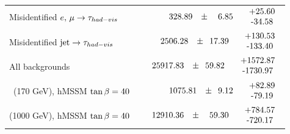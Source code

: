\begin{table}
\begin{center}
{\begin{tabular}{l|r}
			Misidentified $e,\,\mu \to \tau_{had-vis}$   & $\phantom{00}328.89\phantom{.0}\pm\phantom{00}6.85\phantom{.0}\phantom{0}\begin{tabular}{c}+25.60 \\-34.58\end{tabular}$  \\ \cline{2-2}
			Misidentified $\mbox{jet} \to \tau_{had-vis}$ & $\phantom{0}2506.28\phantom{.0}\pm\phantom{0}17.39\phantom{.0}\phantom{0}\begin{tabular}{c}+130.53 \\-133.40\end{tabular}$ \\ \cline{2-2}
			\hline
			All backgrounds   & $25917.83\phantom{.0}\pm\phantom{0}59.82\phantom{.0}\phantom{0}\begin{tabular}{c}+1572.87 \\-1730.97\end{tabular}$  \\
			\hline
			\Hpm $\phantom{0}$(170 GeV), hMSSM $\tan\beta=40$ & $\phantom{0}1075.81\phantom{.0}\pm\phantom{0}9.12\phantom{.0}\phantom{0}\begin{tabular}{c}+82.89 \\-79.19\end{tabular}$  \\
			\Hpm (1000 GeV), hMSSM $\tan\beta=40$ & $\phantom{000}12910.36\phantom{0.}\pm\phantom{00}59.30\phantom{0.}\phantom{0}\begin{tabular}{c}+784.57 \\-720.17\end{tabular}$  \\
			\hline
			\end{tabular}}
			\end{center}
		\end{table}

